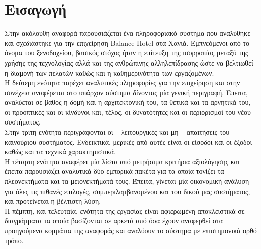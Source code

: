 \chapter{Εισαγωγή}

Στην ακόλουθη αναφορά παρουσιάζεται ένα πληροφοριακό σύστημα που 
αναλύθηκε και σχεδιάστηκε για την επιχείρηση Balance Hotel στα Χανιά. 
Εμπνεόμενοι από το όνομα του ξενοδοχείου, βασικός στόχος ήταν η επίτευξη 
της ισορροπίας μεταξύ της χρήσης της τεχνολογίας αλλά και της ανθρώπινης 
αλληλεπίδρασης ώστε να βελτιωθεί η διαμονή των πελατών καθώς και η 
καθημερινότητα των εργαζομένων.\\ 

\noindent
Η δεύτερη ενότητα παρέχει αναλυτικές πληροφορίες για την επιχείρηση 
και στην συνέχεια αναφέρεται στο υπάρχον σύστημα δίνοντας μία γενική 
περιγραφή. Έπειτα, αναλύεται σε βάθος η δομή και η αρχιτεκτονική του, τα 
θετικά και τα αρνητικά του, οι προοπτικές και οι κίνδυνοι και, τέλος, οι 
δυνατότητες και οι περιορισμοί του νέου συστήματος.\\

\noindent
Στην τρίτη ενότητα περιγράφονται οι – λειτουργικές και μη – απαιτήσεις 
του καινούριου συστήματος. Ενδεικτικά, μερικές από αυτές είναι οι είσοδοι 
και οι έξοδοι καθώς και τα τεχνικά χαρακτηριστικά.\\

\noindent
Η τέταρτη ενότητα αναφέρει μία λίστα από μετρήσιμα κριτήρια αξιολόγησης 
και έπειτα παρουσιάζει αναλυτικά δύο εμπορικά πακέτα για τα οποία τονίζει 
τα πλεονεκτήματα και τα μειονεκτήματά τους. Έπειτα, γίνεται μία οικονομική
ανάλυση για όλες τις πιθανές επιλογές, συμπεριλαμβανομένου και του δικού 
μας συστήματος, και προτείνεται η βέλτιστη λύση.\\

\noindent
Η πέμπτη, και τελευταία, ενότητα της εργασίας είναι αφιερωμένη αποκλειστικά 
σε διαγράμματα τα οποία βασίζονται σε αρκετά από όσα έχουν αναφερθεί στα 
προηγούμενα κομμάτια της αναφοράς και αναλύουν το σύστημα με 
επιστημονικά ορθό τρόπο.